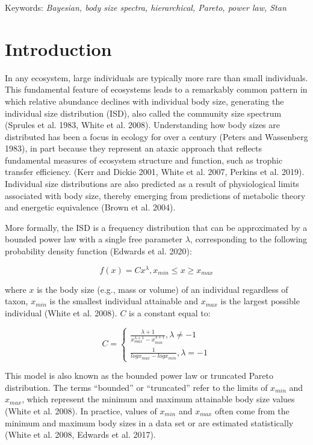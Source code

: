 \documentclass[
  12pt,
]{article}
\begin{document}
Keywords: \emph{Bayesian, body size spectra, hierarchical, Pareto, power
law, Stan}

\newpage

\hypertarget{introduction}{%
\section{Introduction}\label{introduction}}

In any ecosystem, large individuals are typically more rare than small
individuals. This fundamental feature of ecosystems leads to a
remarkably common pattern in which relative abundance declines with
individual body size, generating the individual size distribution (ISD),
also called the community size spectrum (Sprules et al. 1983, White et
al. 2008). Understanding how body sizes are distributed has been a focus
in ecology for over a century (Peters and Wassenberg 1983), in part
because they represent an ataxic approach that reflects fundamental
measures of ecosystem structure and function, such as trophic transfer
efficiency. (Kerr and Dickie 2001, White et al. 2007, Perkins et al.
2019). Individual size distributions are also predicted as a result of
physiological limits associated with body size, thereby emerging from
predictions of metabolic theory and energetic equivalence (Brown et al.
2004).

More formally, the ISD is a frequency distribution that can be
approximated by a bounded power law with a single free parameter
\(\lambda\), corresponding to the following probability density function
(Edwards et al. 2020):

\begin{equation}
f(x) = Cx^\lambda, x_{min} \le x \ge x_{max}
\end{equation}

where \(x\) is the body size (e.g., mass or volume) of an individual
regardless of taxon, \(x_{min}\) is the smallest individual attainable
and \(x_{max}\) is the largest possible individual (White et al. 2008).
\(C\) is a constant equal to:

\begin{equation}
 C = \begin{cases}\frac{\lambda + 1}{{x_{max}^{\lambda+1}} - {x_{min}^{\lambda+1}}}, \lambda \neq-1 \\
\frac{1}{{logx_{max}} - {logx_{min}}}, \lambda = -1\end{cases}
\end{equation}

This model is also known as the bounded power law or truncated Pareto
distribution. The terms ``bounded'' or ``truncated'' refer to the limits
of \(x_{min}\) and \(x_{max}\), which represent the minimum and maximum
attainable body size values (White et al. 2008). In practice, values of
\(x_{min}\) and \(x_{max}\) often come from the minimum and maximum body
sizes in a data set or are estimated statistically (White et al. 2008,
Edwards et al. 2017).
\end{document}
